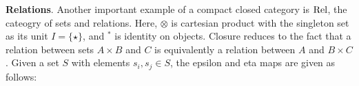 


\medskip
\noindent
{\bf Relations}.
Another important example of a  compact closed category is
$\mathrm{Rel}$, the cateogry of sets and relations. Here, $\otimes$ is
cartesian product with the singleton set as its unit $I = \{\star\}$, and $^*$ is identity on objects. Closure reduces to the
fact that a relation between sets $A\times B$ and $C$ is equivalently a relation between $A$ and $B \times C$.   Given a set $S$ with elements $s_i, s_j \in S$,  the epsilon and eta maps are given as follows:

